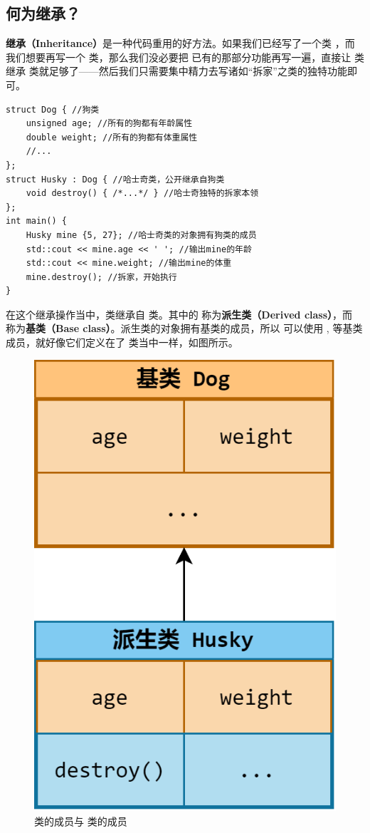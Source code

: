 \subsection*{何为继承？}
\textbf{继承（Inheritance）}是一种代码重用的好方法。如果我们已经写了一个类 \lstinline@Dog@，而我们想要再写一个 \lstinline@Husky@ 类，那么我们没必要把 \lstinline@Dog@ 已有的那部分功能再写一遍，直接让 \lstinline@Husky@ 类继承 \lstinline@Dog@ 类就足够了——然后我们只需要集中精力去写诸如``拆家''之类的独特功能即可。\par
\begin{lstlisting}
struct Dog { //狗类
    unsigned age; //所有的狗都有年龄属性
    double weight; //所有的狗都有体重属性
    //...
};
struct Husky : Dog { //哈士奇类，公开继承自狗类
    void destroy() { /*...*/ } //哈士奇独特的拆家本领
};
int main() {
    Husky mine {5, 27}; //哈士奇类的对象拥有狗类的成员
    std::cout << mine.age << ' '; //输出mine的年龄
    std::cout << mine.weight; //输出mine的体重
    mine.destroy(); //拆家，开始执行
}
\end{lstlisting}
在这个继承操作当中，\lstinline@Husky@ 类继承自 \lstinline@Dog@ 类。其中的 \lstinline@Husky@ 称为\textbf{派生类（Derived class）}，而 \lstinline@Dog@ 称为\textbf{基类（Base class）}。派生类的对象拥有基类的成员，所以 \lstinline@mine@ 可以使用 \lstinline@age@, \lstinline@weight@ 等基类成员，就好像它们定义在了 \lstinline@Husky@ 类当中一样，如图所示。
\begin{figure}[htbp]
    \centering
    \includegraphics[width=.35\textwidth]{../images/generalized_parts/09_dog_and_husky_relationship.drawio.png}
    \caption{\lstinline@Dog@ 类的成员与 \lstinline@Husky@ 类的成员}
\end{figure}\par\newpage
